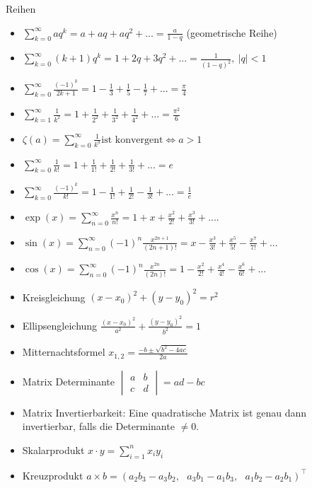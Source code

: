 \begin{Rechenregeln}{Reihen}{}
    \begin{itemize}
        \item $\sum_{k=0}^{\infty} aq^{k} = a + aq + aq^{2} +... = \frac{a}{1-q}$ (geometrische Reihe)
        \item $\sum_{k=0}^{\infty} (k+1)q^{k} = 1 + 2q + 3q^{2} +... = \frac{1}{(1-q)^{2}}, \ \vert q \vert < 1$ 
        \item $\sum_{k=0}^{\infty} \frac{(-1)^{k}}{2k+1} = 1 - \frac{1}{3} + \frac{1}{5} - \frac{1}{7} + ... = \frac{\pi}{4}$
        \item $\sum_{k=1}^{\infty} \frac{1}{k^{2}} = 1 + \frac{1}{2^{2}} + \frac{1}{3^{2}} + \frac{1}{4^{2}} + ... = \frac{\pi^{2}}{6}$
        \item $\zeta(a) = \sum_{k=0}^{\infty} \frac{1}{k^{a}} \text{ist konvergent} \iff a>1$
        \item $\sum_{k=0}^{\infty} \frac{1}{k!} = 1+\frac{1}{1!} + \frac{1}{2!} + \frac{1}{3!} + ... = e$
        \item $\sum_{k=0}^{\infty} \frac{(-1)^{k}}{k!} = 1 - \frac{1}{1!} + \frac{1}{2!} - \frac{1}{3!} + ... = \frac{1}{e}$
        \item $\exp(x) = \sum_{n=0}^{\infty} \frac{x^{n}}{n!} = 1 + x + \frac{x^{2}}{2!} + \frac{x^{3}}{3!} + ....$
        \item $\sin(x) =  \sum_{n=0}^{\infty} (-1)^{n}\frac{x^{2n+1}}{(2n +1)!} = x - \frac{x^{3}}{3!} + \frac{x^{5}}{5!} - \frac{x^{7}}{7!} + ...$ 
        \item $\cos(x) =  \sum_{n=0}^{\infty} (-1)^{n}\frac{x^{2n}}{(2n)!} = 1 - \frac{x^{2}}{2!} + \frac{x^{4}}{4!} - \frac{x^{6}}{6!} + ...$ 
    \end{itemize}
\end{Rechenregeln}

\begin{Diverses}{}{}
    \begin{itemize}
    \item Kreisgleichung $(x - x_0)^2 + (y - y_0)^2 = r^2$
    \item Ellipsengleichung $\frac{(x-x_0)^2}{a^2} + \frac{(y-y_0)^2}{b^2} = 1$
    \item Mitternachtsformel $x_{1, 2} = \frac{-b \pm \sqrt{b^2 - 4ac}}{2a}$
    \item Matrix Determinante $\begin{vmatrix}
        a & b\\
        c & d
    \end{vmatrix} = ad-bc$
    \item Matrix Invertierbarkeit: Eine quadratische Matrix ist genau dann invertierbar, falls die Determinante $\neq 0$.
    \item Skalarprodukt $x \cdot y = \sum_{i=1}^n x_i y_i$
    \item Kreuzprodukt $a \times b = (a_2b_3-a_3b_2, ~~~ a_3b_1-a_1b_3, ~~~ a_1b_2-a_2b_1)^\top$
    \end{itemize}
\end{Diverses}

